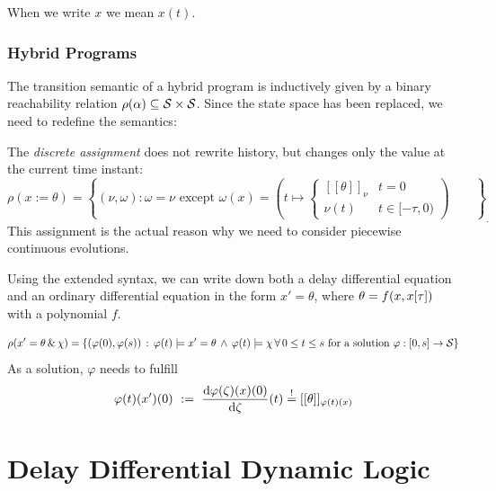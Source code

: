 \documentclass[10pt]{article}
\begin{document}
            When we write $x$ we mean $x(t)$.

        \subsubsection{Hybrid Programs}
            \label{sec:hp-semantics}

            The transition semantic of a hybrid program is inductively given by a binary reachability relation $\rho(\alpha)\subseteq\mathcal{S}\times\mathcal{S}$. Since the state space has been replaced, we need to redefine the semantics:

            The \emph{discrete assignment} does not rewrite history, but changes only the value at the current time instant:
            \begin{equation}
            \rho(x:=\theta) = \left\{(\nu,\omega): \omega = \nu \text{ except } \omega(x)=\left(t\mapsto\begin{cases}[[\theta]]_\nu & t=0\\ \nu(t) &t\in[-\tau,0)\end{cases}\right)\qquad\right\}_.
            \end{equation}
            This assignment is the actual reason why we need to consider piecewise continuous evolutions.


            Using the extended syntax, we can write down both a delay differential equation and an ordinary differential equation in the form $x'=\theta$, where $\theta=f(x,x[\tau])$ with a polynomial $f$.

            \begin{equation}
                \rho(x'=\theta\,\&\,\chi) = \left\{ (\varphi(0),\varphi(s))\,:\,\varphi(t)\models x'=\theta\,\wedge\,\varphi(t)\models\chi\,\forall\,0\leq t\leq s\text{ for a solution } \varphi:[0,s]\rightarrow\mathcal{S} \right\}
            \end{equation} As a solution, $\varphi$ needs to fulfill \begin{equation}
                \varphi(t)(x')(0) ~\mathrel{\mathop{:}}=~ \frac{\text{d} \varphi(\zeta)(x)(0)}{\text{d} \zeta}(t) \stackrel{!}{=} [[\theta]]_{\varphi(t)(x)}
            \end{equation}

\section{Delay Differential Dynamic Logic}
    \label{sec:delay-differential-dynamic-logic}
\end{document}
